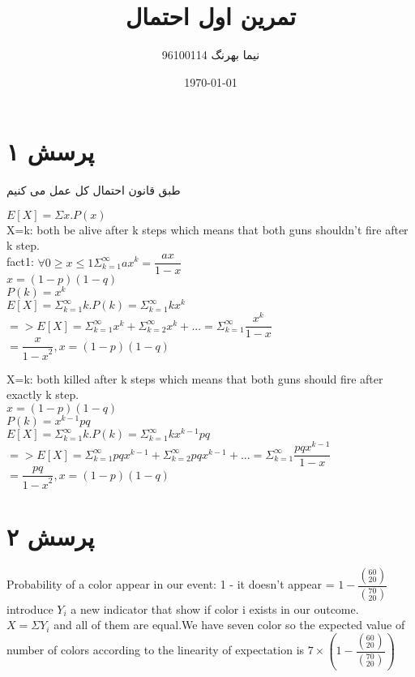 \documentclass[a4paper]{article}
\title{تمرین اول احتمال}
\author{نیما بهرنگ 96100114}
\date{\today}
\begin{document}
\maketitle
{}


\section*{پرسش ۱}
طبق قانون احتمال کل عمل می کنیم
\begin{enumerate}
\begin{latin}
\item{}
$E[X] = \Sigma{x.P(x)}$\\
X=k: both be alive after k steps which means that both guns shouldn't fire after k step.\\
fact1: $\forall 0 \geq x \leq 1 \Sigma^{\infty}_{k=1} ax^k = \dfrac{ax}{1-x}$\\

$x=(1-p)(1-q)$\\
$P(k)= x^k$\\
$E[X] = \Sigma^{\infty}_{k=1} k.P(k) = \Sigma^{\infty}_{k=1}kx^k$\\
$=> E[X] = \Sigma^{\infty}_{k=1} x^k + \Sigma^{\infty}_{k=2} x^k + ... = \Sigma^{\infty}_{k=1} \dfrac{x^k}{1-x}$\\
$=\dfrac{x}{{1-x}^2}, x=(1-p)(1-q)$\\

\item{}
X=k: both killed after k steps which means that both guns should fire after exactly k step.\\
$x=(1-p)(1-q)$\\
$P(k)= x^{k-1}pq$\\
$E[X] = \Sigma^{\infty}_{k=1} k.P(k) = \Sigma^{\infty}_{k=1}kx^{k-1}pq $\\
$=> E[X] = \Sigma^{\infty}_{k=1} pqx^{k-1} + \Sigma^{\infty}_{k=2} pqx^{k-1} + ... = \Sigma^{\infty}_{k=1} \dfrac{pqx^{k-1}}{1-x}$\\
$=\dfrac{pq}{{1-x}^2}, x=(1-p)(1-q)$\\

\end{latin}
\end{enumerate}
\pagebreak
\section*{پرسش ۲}
\begin{latin}
Probability of a color appear in our event: 1 - it doesn't appear = $1 - \dfrac{(^{60}_{20})}{(^{70}_{20})}$\\
introduce $Y_i$ a new indicator that show if color i exists in our outcome.\\
$X=\Sigma Y_i$ and all of them are equal.We have seven color so the expected value of number of colors according to the linearity of expectation is $7\times (1 - \dfrac{(^{60}_{20})}{(^{70}_{20})})$

\end{latin}
\pagebreak
\end{document}
